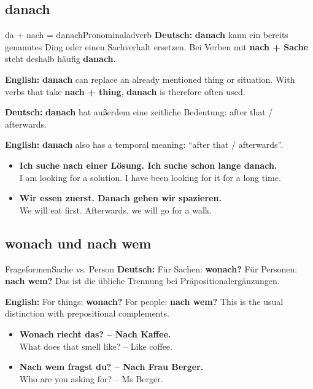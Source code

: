 \documentclass[a4paper,11pt]{article}
\newcommand{\GermanText}[1]{\textbf{Deutsch: }#1\par}
\newcommand{\EnglishText}[1]{{\small\color{SoftGray}\textbf{English: }#1\par}}
\newcommand{\ExampleItem}[2]{\item \textbf{#1}\\{\small\color{SoftGray}#2}}
\begin{document}
        \subsection{danach}

        \begin{grammarentry}{da + nach = danach}{Pronominaladverb}
            \GermanText{\textbf{danach} kann ein bereits genanntes Ding oder einen Sachverhalt ersetzen. Bei Verben mit \textbf{nach + Sache} steht deshalb häufig \textbf{danach}.}
            \EnglishText{\textbf{danach} can replace an already mentioned thing or situation. With verbs that take \textbf{nach + thing}, \textbf{danach} is therefore often used.}

            \GermanText{\textbf{danach} hat außerdem eine zeitliche Bedeutung: \glqq after that / afterwards\grqq.}
            \EnglishText{\textbf{danach} also has a temporal meaning: ``after that / afterwards''.}
        \end{grammarentry}

        \begin{exbox}
            \begin{itemize}
                \ExampleItem{Ich suche nach einer Lösung. Ich suche schon lange danach.}{I am looking for a solution. I have been looking for it for a long time.}
                \ExampleItem{Wir essen zuerst. Danach gehen wir spazieren.}{We will eat first. Afterwards, we will go for a walk.}
            \end{itemize}
        \end{exbox}

        \subsection{wonach und nach wem}

        \begin{grammarentry}{Frageformen}{Sache vs. Person}
            \GermanText{Für Sachen: \textbf{wonach?} Für Personen: \textbf{nach wem?} Das ist die übliche Trennung bei Präpositionalergänzungen.}
            \EnglishText{For things: \textbf{wonach?} For people: \textbf{nach wem?} This is the usual distinction with prepositional complements.}
        \end{grammarentry}

        \begin{exbox}
            \begin{itemize}
                \ExampleItem{Wonach riecht das? -- Nach Kaffee.}{What does that smell like? -- Like coffee.}
                \ExampleItem{Nach wem fragst du? -- Nach Frau Berger.}{Who are you asking for? -- Ms Berger.}
            \end{itemize}
        \end{exbox}
\end{document}
